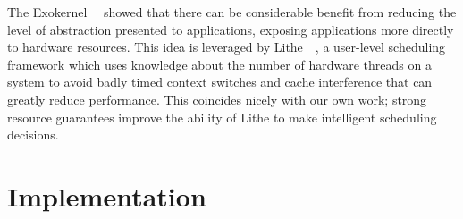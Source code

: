\documentclass[letterpaper,twocolumn,11pt]{article}
\begin{document}
The Exokernel~\cite{Engler:1995:EOS:224056.224076}~\cite{Engler:1995:EOS:224057.224076} showed that there can be considerable benefit from reducing the level of abstraction presented to applications, exposing applications more directly to hardware resources. This idea is leveraged by Lithe~\cite{Pan:2010:CPS:1809028.1806639}~\cite{Pan:2010:CPS:1806596.1806639}, a user-level scheduling framework which uses knowledge about the number of hardware threads on a system to avoid badly timed context switches and cache interference that can greatly reduce performance. This coincides nicely with our own work; strong resource guarantees improve the ability of Lithe to make intelligent scheduling decisions.

\section{Implementation}
\end{document}
